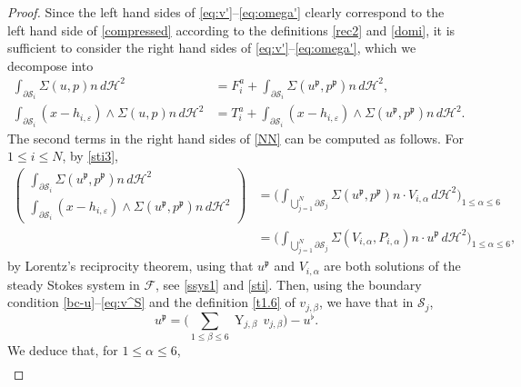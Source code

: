 \documentclass[10pt]{amsart}
\let\eps\varepsilon
\DeclareMathOperator{\Y}{Y}
\theoremstyle{definition}
\theoremstyle{remark}
\let\oldbigcup\bigcup
\begin{document}
\begin{proof}
Since the left hand sides of \eqref{eq:v'}--\eqref{eq:omega'} clearly correspond to
the left hand side of \eqref{compressed} according to the definitions \eqref{rec2} and \eqref{domi}, it is sufficient to
consider the right hand sides of \eqref{eq:v'}--\eqref{eq:omega'}, which we decompose into
\begin{subequations}
\label{NN}
\begin{align}
\int_{\partial \mathcal S_i } \Sigma(u,p) n \, d\mathcal{H}^2
&= F_i^a +\int_{\partial \mathcal S_i } \Sigma (u^\mathfrak{p}, p^\mathfrak{p}) n \, d\mathcal{H}^2, \\
\int_{\partial \mathcal S_i} (x - h_{i,\eps}) \wedge \Sigma(u,p) n \, d\mathcal{H}^2
&= T_i^a +
\int_{\partial \mathcal S_i} (x - h_{i,\eps}) \wedge \Sigma (u^\mathfrak{p}, p^\mathfrak{p}) n \, d\mathcal{H}^2.
\end{align}
\end{subequations}
The second terms in the right hand sides of \eqref{NN} can be computed as follows.
For $1 \leq i \leq N$, by \eqref{sti3},
\begin{align*}
\begin{pmatrix}
\int_{\partial \mathcal S_i } \Sigma(u^\mathfrak{p}, p^\mathfrak{p}) n \, d\mathcal{H}^2 \\
\int_{\partial \mathcal S_i} (x - h_{i,\eps}) \wedge \Sigma(u^\mathfrak{p}, p^\mathfrak{p}) n \, d\mathcal{H}^2
\end{pmatrix}
&=
\biggl(
\int_{\oldbigcup_{j=1}^N \partial \mathcal S_j }
\Sigma(u^\mathfrak{p}, p^\mathfrak{p}) n \cdot V_{i,\alpha} \, d\mathcal{H}^2
\biggr)_{1 \leq \alpha \leq 6}
\\ &=
\biggl(
\int_{\oldbigcup_{j=1}^N \partial \mathcal S_j } \Sigma(V_{i,\alpha}, P_{i,\alpha}) n \cdot u^\mathfrak{p} \, d\mathcal{H}^2
\biggr)_{1 \leq \alpha \leq 6},
\end{align*}
by Lorentz's reciprocity theorem, using that $u^\mathfrak{p}$ and $V_{i,\alpha}$ are both solutions of the steady Stokes system in $ \mathcal F$, see \eqref{ssys1} and \eqref{sti}.
Then, using the boundary condition \eqref{bc-u}--\eqref{eq:v^S} and the definition \eqref{t1.6} of $v_{j,\beta}$, we have that in $ \mathcal{S}_j$,
\begin{equation} \label{rec1}
u^\mathfrak{p} = \biggl(\sum_{1\leq \beta \leq 6} \Y_{j,\beta }\, v_{j,\beta}\biggr) - u^\flat.
\end{equation}
We deduce that, for $1 \leq \alpha \leq 6$,
\begin{multline*}

\end{multline*}
\end{proof}
\end{document}
